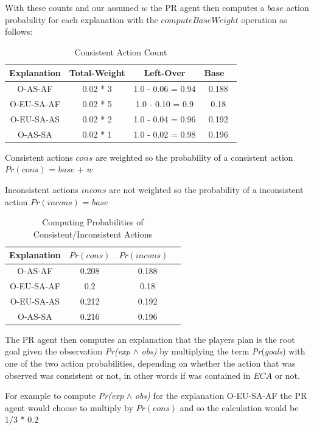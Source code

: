 \documentclass[parskip]{cs4rep}
\begin{document}
With these counts and our assumed $w$ the PR agent then computes a $base$ action probability for each explanation with the $computeBaseWeight$ operation as follows:

\begin{table}[ht]
\centering
\begin{tabular}{|c|c|c|c|}
\hline 
\textbf{Explanation} & Total-Weight & Left-Over & Base \ \\ 
\hline 
O-AS-AF & 0.02 * 3 & 1.0 - 0.06 = 0.94 & 0.188 \\ 
\hline 
O-EU-SA-AF & 0.02 * 5 & 1.0 - 0.10 = 0.9 & 0.18 \\ 
\hline 
O-EU-SA-AS & 0.02 * 2 & 1.0 - 0.04 = 0.96 & 0.192 \\ 
\hline 
O-AS-SA & 0.02 * 1 & 1.0 - 0.02 = 0.98 & 0.196 \\ 
\hline 
\end{tabular}
\caption{Consistent Action Count}
\label{table:territory-actions-bonus}
\end{table}

Consistent actions $cons$ are weighted so the probability of a consistent action $Pr(cons)$ = $base$ + $w$

Inconsistent actions $incons$ are not weighted so the probability of a inconsistent action $Pr(incons)$ = $base$

\begin{table}[ht]
\centering
\begin{tabular}{|c|c|c|}
\hline 
\textbf{Explanation} & $Pr(cons)$ & $Pr(incons)$ \ \\ 
\hline 
O-AS-AF & 0.208 & 0.188 \\ 
\hline 
O-EU-SA-AF & 0.2 & 0.18 \\ 
\hline 
O-EU-SA-AS & 0.212 & 0.192 \\ 
\hline 
O-AS-SA & 0.216 & 0.196 \\ 
\hline 
\end{tabular}
\caption{Computing Probabilities of Consistent/Inconsistent Actions}
\label{table:territory-actions-bonus}
\end{table}

The PR agent then computes an explanation that the players plan is the root goal given the observation \textit{Pr(exp} $\wedge$ \textit{obs)} by multiplying the term  \textit{Pr}(\textit{goals}) with one of the two action probabilities, depending on whether the action that was observed was consistent or not, in other words if was contained in $ECA$ or not.

For example to compute \textit{Pr(exp} $\wedge$ \textit{obs)} for the explanation O-EU-SA-AF the PR agent would choose to multiply by $Pr(cons)$ and so the calculation would be 1/3 * 0.2 
\end{document}
